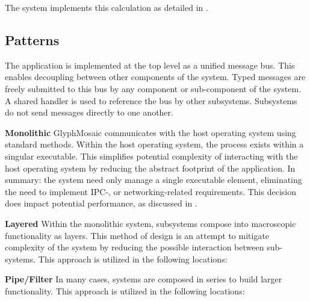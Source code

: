 \begin{itemize}
{{\begin{itemize}
{          The system implements this calculation as detailed in .
        }
      \end{itemize}
    }
  }
\end{itemize}


\subsection{Patterns}
The application is implemented at the top level as a unified message bus.
This enables decoupling between other components of the system.
Typed messages are freely submitted to this bus by any component or sub-component of the system.
A shared handler is used to reference the bus by other subsystems.
Subsystems do not send messages directly to one another.


\textbf{Monolithic}
GlyphMosaic communicates with the host operating system using standard methods.
Within the host operating system, the process exists within a singular executable.
This simplifies potential complexity of interacting with the host operating system by reducing the abstract footprint of the application.
In summary: the system need only manage a single executable element, eliminating the need to implement IPC-, or networking-related requirements.
This decision does impact potential performance, as discussed in .


\textbf{Layered}
Within the monolithic system, subsystems compose into macroscopic functionality as layers.
This method of design is an attempt to mitigate complexity of the system by reducing the possible interaction between sub-systems.
This approach is utilized in the following locations:
\begin{itemize}
\end{itemize}


\textbf{Pipe/Filter}
In many cases, systems are composed in series to build larger functionality.
This approach is utilized in the following locations:
\begin{itemize}
\end{itemize}


